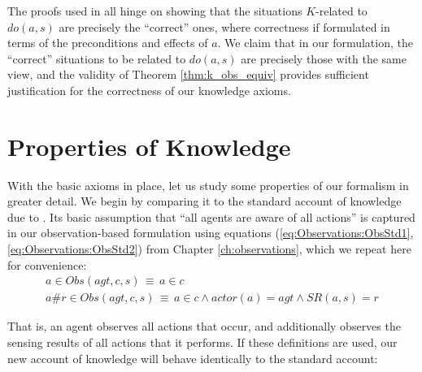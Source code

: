 The proofs used in \citep{scherl03sc_knowledge} all hinge on showing
that the situations $K$-related to $do(a,s)$ are precisely the {}``correct''
ones, where correctness if formulated in terms of the preconditions
and effects of $a$. We claim that in our formulation, the {}``correct''
situations to be related to $do(a,s)$ are precisely those with the
same view, and the validity of Theorem \ref{thm:k_obs_equiv} provides
sufficient justification for the correctness of our knowledge axioms.


\section{Properties of Knowledge\label{sec:Knowledge:Properties}}

With the basic axioms in place, let us study some properties of our
formalism in greater detail. We begin by comparing it to the standard
account of knowledge due to \citet{scherl03sc_knowledge}. Its basic
assumption that {}``all agents are aware of all actions'' is captured
in our observation-based formulation using equations (\ref{eq:Observations:ObsStd1},\ref{eq:Observations:ObsStd2})
from Chapter \ref{ch:observations}, which we repeat here for convenience:\begin{gather*}
a\in Obs(agt,c,s)\,\equiv\, a\in c\\
a\#r\in Obs(agt,c,s)\,\equiv\, a\in c\wedge actor(a)=agt\wedge SR(a,s)=r\end{gather*}


That is, an agent observes all actions that occur, and additionally
observes the sensing results of all actions that it performs. If these
definitions are used, our new account of knowledge will behave identically
to the standard account:

